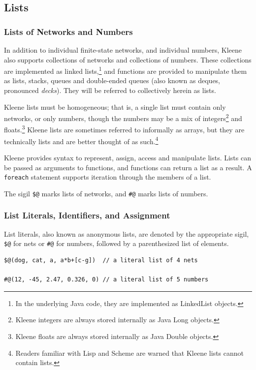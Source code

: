 \documentclass[letterpaper,12pt]{article}
\begin{document}
\subsection{Lists}


\subsubsection{Lists of Networks and Numbers}

In addition to individual finite-state networks, and individual numbers,
Kleene also supports collections of networks and collections of numbers.
These collections are implemented as linked lists,\footnote{In the
underlying Java code, they are implemented as LinkedList objects.} and
functions are provided to manipulate them as lists, stacks, queues and
double-ended queues (also known as deques, pronounced \emph{decks}).
They will be referred to collectively herein as lists.

Kleene lists must be homogeneous; that is, a single list must contain
only networks, or only numbers, though the numbers may be a mix of
integers\footnote{Kleene integers are always stored internally as Java
Long objects.} and floats.\footnote{Kleene floats are always stored
internally as Java Double objects.}  Kleene lists are sometimes referred
to informally as arrays, but they are technically lists and are better
thought of as such.\footnote{Readers familiar with Lisp and Scheme are
warned that Kleene lists cannot contain lists.}

Kleene provides syntax to represent, assign, access and manipulate lists.
Lists can be passed as arguments to functions, and functions can
return a list as a result.  A \texttt{foreach} statement supports
iteration through the members of a list.

The sigil \verb!$@! marks lists of networks, and \verb!#@! marks lists of
numbers. 

\subsubsection{List Literals, Identifiers, and Assignment}

List literals, also known as anonymous lists, are denoted by the
appropriate sigil, \verb!$@! for nets or \verb!#@! for numbers, followed
by a parenthesized list of elements.

\begin{Verbatim}[fontsize=\small]
$@(dog, cat, a, a*b+[c-g])  // a literal list of 4 nets

#@(12, -45, 2.47, 0.326, 0) // a literal list of 5 numbers
\end{Verbatim}
\end{document}
